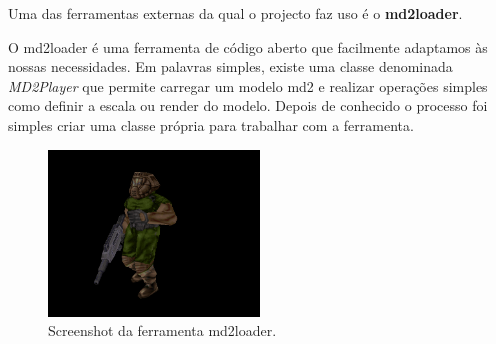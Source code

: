 

Uma das ferramentas externas da qual o projecto faz uso é o {\bf md2loader}.

O md2loader é uma ferramenta de código aberto que facilmente adaptamos às nossas necessidades. Em palavras simples, existe uma classe denominada \textit{MD2Player} que permite carregar um modelo md2 e realizar operações simples como definir a escala ou render do modelo. Depois de conhecido o processo foi simples criar uma classe própria para trabalhar com a ferramenta.

\-

\begin{figure}[h]
\begin{center}
\includegraphics[width=0.5\textwidth]{images/md2loader.png}
\caption{Screenshot da ferramenta md2loader.}
\end{center}
\end{figure}



